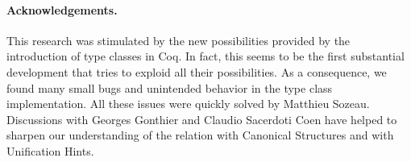 \documentclass[a4paper,10pt,runningheads]{llncs}
\begin{document}
\paragraph{Acknowledgements.}
This research was stimulated by the new possibilities provided by the introduction of type classes
in Coq. In fact, this seems to be the first substantial development that tries to exploid all their
possibilities. As a consequence, we found many small bugs and unintended behavior in the type
class implementation. All these issues were quickly solved by Matthieu Sozeau. Discussions with
Georges Gonthier and Claudio Sacerdoti Coen have helped to
sharpen our understanding of the relation with Canonical Structures and with Unification Hints.


\end{document}

